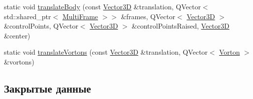 \begin{DoxyCompactItemize}
static void \mbox{\hyperlink{class_frame_calculations_a9180d3ce990339ef141c53064eefca20}{translate\+Body}} (const \mbox{\hyperlink{class_vector3_d}{Vector3D}} \&translation, Q\+Vector$<$ std\+::shared\+\_\+ptr$<$ \mbox{\hyperlink{class_multi_frame}{Multi\+Frame}} $>$$>$ \&frames, Q\+Vector$<$ \mbox{\hyperlink{class_vector3_d}{Vector3D}} $>$ \&control\+Points, Q\+Vector$<$ \mbox{\hyperlink{class_vector3_d}{Vector3D}} $>$ \&control\+Points\+Raised, \mbox{\hyperlink{class_vector3_d}{Vector3D}} \&center)
\item 
static void \mbox{\hyperlink{class_frame_calculations_a8b261b5f1f933306a66a4461aae64e64}{translate\+Vortons}} (const \mbox{\hyperlink{class_vector3_d}{Vector3D}} \&translation, Q\+Vector$<$ \mbox{\hyperlink{class_vorton}{Vorton}} $>$ \&vortons)
\end{DoxyCompactItemize}
\subsection*{Закрытые данные}
